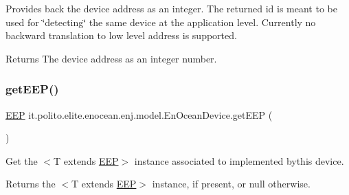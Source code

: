 Provides back the device address as an integer. The returned id is meant to be used for \char`\"{}detecting\char`\"{} the same device at the application level. Currently no backward translation to low level address is supported.

\begin{DoxyReturn}{Returns}
The device address as an integer number. 
\end{DoxyReturn}
\hypertarget{classit_1_1polito_1_1elite_1_1enocean_1_1enj_1_1model_1_1_en_ocean_device_a645305a968639d3b9e7dfee10b3fa30e}{}\label{classit_1_1polito_1_1elite_1_1enocean_1_1enj_1_1model_1_1_en_ocean_device_a645305a968639d3b9e7dfee10b3fa30e} 
\subsubsection{\texorpdfstring{get\+E\+E\+P()}{getEEP()}}
{\footnotesize\ttfamily \hyperlink{classit_1_1polito_1_1elite_1_1enocean_1_1enj_1_1eep_1_1_e_e_p}{E\+EP} it.\+polito.\+elite.\+enocean.\+enj.\+model.\+En\+Ocean\+Device.\+get\+E\+EP (\begin{DoxyParamCaption}{ }\end{DoxyParamCaption})}

Get the {\ttfamily $<$T extends \hyperlink{}{E\+EP}$>$} instance associated to implemented bythis device.

\begin{DoxyReturn}{Returns}
the {\ttfamily $<$T extends \hyperlink{}{E\+EP}$>$} instance, if present, or null otherwise. 
\end{DoxyReturn}
\hypertarget{classit_1_1polito_1_1elite_1_1enocean_1_1enj_1_1model_1_1_en_ocean_device_a1f7a10d71f6e0316b76d4bc8313720ae}{}\label{classit_1_1polito_1_1elite_1_1enocean_1_1enj_1_1model_1_1_en_ocean_device_a1f7a10d71f6e0316b76d4bc8313720ae} 
